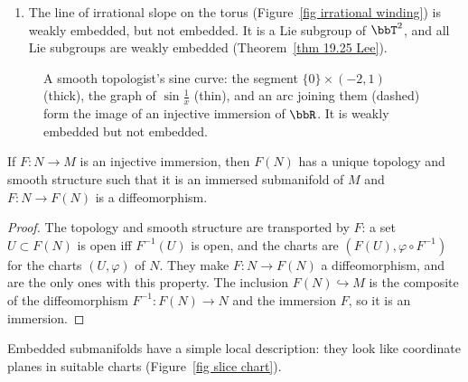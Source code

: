 \begin{example}
\begin{enumerate}
        \item The line of irrational slope on the torus (Figure~\ref{fig irrational winding}) is weakly embedded, but not embedded. It is a Lie subgroup of $\bbT^2$, and all Lie subgroups are weakly embedded (Theorem~\ref{thm 19.25 Lee}).
    \end{enumerate}
\end{example}

\begin{figure}[tp]
    \centering
    \caption{A smooth topologist's sine curve: the segment $\{0\}\times(-2,1)$ (thick), the graph of $\sin\frac1x$ (thin), and an arc joining them (dashed) form the image of an injective immersion of $\bbR$. It is weakly embedded but not embedded.}
    \label{fig smooth sine curve}
\end{figure}

\begin{prop}\label{prop 5.18 Lee}
    If $F:N\to M$ is an injective immersion, then $F(N)$ has a unique topology and smooth structure such that it is an immersed submanifold of $M$ and $F:N\to F(N)$ is a diffeomorphism.
\end{prop}
\begin{proof}
    The topology and smooth structure are transported by $F$: a set $U\subset F(N)$ is open iff $F^{-1}(U)$ is open, and the charts are $(F(U),\varphi\circ F^{-1})$ for the charts $(U,\varphi)$ of $N$. They make $F:N\to F(N)$ a diffeomorphism, and are the only ones with this property. The inclusion $F(N)\hookrightarrow M$ is the composite of the diffeomorphism $F^{-1}:F(N)\to N$ and the immersion $F$, so it is an immersion.
\end{proof}

Embedded submanifolds have a simple local description: they look like coordinate planes in suitable charts (Figure~\ref{fig slice chart}).

